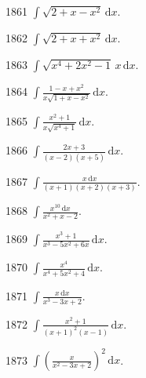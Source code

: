 \begin{prob}[S]{1861}
$\int \sqrt{2 + x - x^2}\,\mathrm{d}x$.
\end{prob}

\begin{prob}[S]{1862}
$\int \sqrt{2 + x + x^2}\,\mathrm{d}x$.
\end{prob}

\begin{prob}[S]{1863}
$\int \sqrt{x^4 + 2x^2 - 1}\,x\,\mathrm{d}x$.
\end{prob}

\begin{prob}[S]{1864}
$\int \frac{1 - x + x^2}{x\sqrt{1 + x - x^2}}\,\mathrm{d}x$.
\end{prob}

\begin{prob}[S]{1865}
$\int \frac{x^2 + 1}{x\sqrt{x^4 + 1}}\,\mathrm{d}x$.
\end{prob}



\begin{prob}[S]{1866}
$\int \frac{2x + 3}{(x - 2)(x + 5)}\,\mathrm{d}x$.
\end{prob}

\begin{prob}[S]{1867}
$\int \frac{x\,\mathrm{d}x}{(x + 1)(x + 2)(x + 3)}$.
\end{prob}

\begin{prob}[S]{1868}
$\int \frac{x^{10}\,\mathrm{d}x}{x^2 + x - 2}$.
\end{prob}

\begin{prob}[S]{1869}
$\int \frac{x^3 + 1}{x^3 - 5x^2 + 6x}\,\mathrm{d}x$.
\end{prob}

\begin{prob}[S]{1870}
$\int \frac{x^4}{x^4 + 5x^2 + 4}\,\mathrm{d}x$.
\end{prob}

\begin{prob}[S]{1871}
$\int \frac{x\,\mathrm{d}x}{x^3 - 3x + 2}$.
\end{prob}

\begin{prob}[S]{1872}
$\int \frac{x^2 + 1}{(x + 1)^2 (x - 1)}\,\mathrm{d}x$.
\end{prob}

\begin{prob}[S]{1873}
$\int \left(\frac{x}{x^2 - 3x + 2}\right)^2\,\mathrm{d}x$.
\end{prob}

